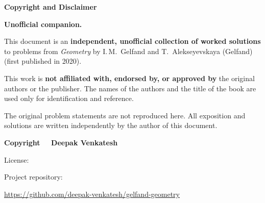 \documentclass[10pt]{article}
\newcounter{problem}
\begin{document}

\clearpage

\thispagestyle{empty}

\vspace*{2cm}

\begin{center}

    {\Large\textbf{Copyright and Disclaimer}}

\end{center}

\vspace{1cm}


\textbf{Unofficial companion.}

\vspace{0.4cm}

This document is an
\textbf{independent, unofficial collection of worked solutions}
to problems from \textit{Geometry} by
I.\,M.~Gelfand and T.~Alekseyevskaya (Gelfand)
(first published in 2020).

\vspace{0.4cm}

This work is
\textbf{not affiliated with, endorsed by, or approved by}
the original authors or the publisher. The names of the authors
and the title of the book are used only for identification and
reference.

\vspace{0.4cm}

The original problem statements are not reproduced here.
All exposition and solutions are written independently by the
author of this document.

\vspace{1.5cm}

\textbf{Copyright \textcopyright\ \the\year\ Deepak Venkatesh}

\vspace{1.5cm}

License:

\doclicenseThis

\vfill

Project repository:

\href{https://github.com/deepak-venkatesh/gelfand-geometry}
{https://github.com/deepak-venkatesh/gelfand-geometry}


\end{document}
